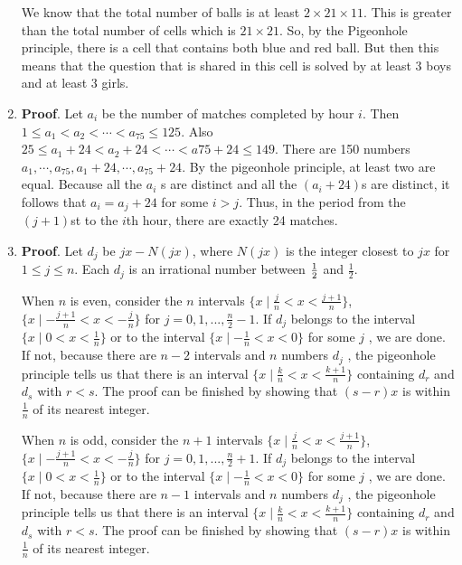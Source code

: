 \documentclass{sig-alternate-05-2015}
\begin{document}
\begin{enumerate}
	We know that the total number of balls is at least $2 \times 21 \times 11$. This is greater than the total number of cells which is $21 \times 21$. So, by the Pigeonhole principle, there is a cell that contains both blue and red ball. But then this means that the question that is shared in this cell is solved by at least 3 boys and at least 3 girls.
	
	\item \textbf{Proof}. Let $a_i$ be the number of matches completed by
	hour $i$. Then $1 \le a_1 < a_2 < \cdots < a_{75} \le 125$. Also
	$25 \le a_1 + 24 < a_2 + 24 < \cdots < a75 + 24 \le 149$. There
	are 150 numbers $a_1, \cdots , a_{75}, a_1 + 24, \cdots , a_{75} + 24$. By the
	pigeonhole principle, at least two are equal. Because all the
	$a_i$ s are distinct and all the $(a_i + 24)$s are distinct, it follows
	that $a_i = a_j + 24$ for some $i > j$. Thus, in the period from
	the $(j + 1)$st to the $i$th hour, there are exactly 24 matches.
	
	\item \textbf{Proof}. Let $d_j$ be $jx − N(jx)$, where $N(jx)$ is the integer
	closest to $jx$ for $1 \le j \le n$. Each $d_j$ is an irrational number
	between $\-\frac{1}{2}$ and $\frac{1}{2}$. 
	
	When $n$ is even, consider the $n$ intervals $\{x \mid \frac{j}{n} < x < \frac{j + 1}{n}\}$, $\{x \mid -\frac{j + 1}{n} < x < -\frac{j}{n}\}$ for $j = 0, 1, . . . , \frac{n}{2} - 1$. If $d_j$ belongs to the interval $\{x \mid 0 < x < \frac{1}{n}\}$ or to the interval $\{x \mid -\frac{1}{n} < x < 0\}$ for some $j$ , we are done. If not, because there are $n - 2$ intervals
	and $n$ numbers $d_j$ , the pigeonhole principle tells us
	that there is an interval $\{x \mid \frac{k}{n} < x < \frac{k + 1}{n}\}$ containing
	$d_r$ and $d_s$ with $r < s$. The proof can be finished by
	showing that $(s - r)x$ is within $\frac{1}{n}$ of its nearest integer.
	
	When $n$ is odd, consider the $n + 1$ intervals $\{x \mid \frac{j}{n} < x < \frac{j + 1}{n}\}$, $\{x \mid -\frac{j + 1}{n} < x < -\frac{j}{n}\}$ for $j = 0, 1, . . . , \frac{n}{2} + 1$. If $d_j$ belongs to the interval $\{x \mid 0 < x < \frac{1}{n}\}$ or to the interval $\{x \mid -\frac{1}{n} < x < 0\}$ for some $j$ , we are done. If not, because there are $n - 1$ intervals	and $n$ numbers $d_j$ , the pigeonhole principle tells us that there is an interval $\{x \mid \frac{k}{n} < x < \frac{k + 1}{n}\}$ containing $d_r$ and $d_s$ with $r < s$. The proof can be finished by showing that $(s - r)x$ is within $\frac{1}{n}$ of its nearest integer.
\end{enumerate}
\end{document}
